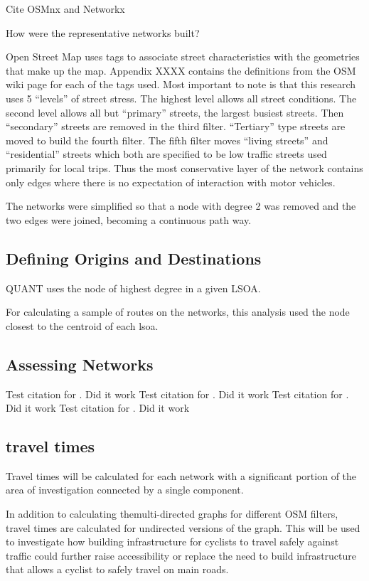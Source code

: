 Cite OSMnx \cite{osmnx} and Networkx \cite{networkx}


How were the representative networks built? 

Open Street Map uses tags to associate street characteristics with the geometries that make up the map. Appendix XXXX contains the definitions from the OSM wiki page for each of the tags used. Most important to note is that this research uses 5 ``levels'' of street stress. The highest level allows all street conditions. The second level allows all but ``primary'' streets, the largest busiest streets. Then ``secondary'' streets are removed in the third filter. ``Tertiary'' type streets are moved to build the fourth filter. The fifth filter moves ``living streets'' and ``residential'' streets which both are specified to be low traffic streets used primarily for local trips. Thus the most conservative layer of the network contains only edges where there is no expectation of interaction with motor vehicles. 

The networks were simplified so that a node with degree 2 was removed and the two edges were joined, becoming a continuous path way.


\subsection{Defining Origins and Destinations}

QUANT uses the node of highest degree in a given LSOA. 

For calculating a sample of routes on the networks, this analysis used the node closest to the centroid of each lsoa. 



\subsection{Assessing Networks}

Test citation for \cite{osmnx}. Did it work
Test citation for \cite{networkx}. Did it work
Test citation for \cite{qgis}. Did it work
Test citation for \cite{python}. Did it work
\subsection{travel times}

Travel times will be calculated for each network with a significant portion of the area of investigation connected by a single component.

In addition to calculating themulti-directed graphs for different OSM filters, travel times are calculated for undirected versions of the graph. This will be used to investigate how building infrastructure for cyclists to travel safely against traffic could further raise accessibility or replace the need to build infrastructure that allows a cyclist to safely travel on main roads. 

